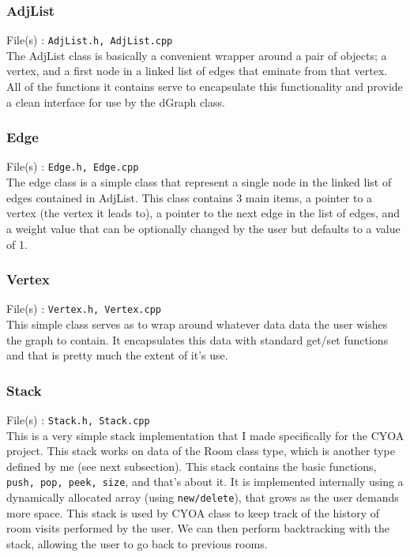 \documentclass[a4paper,11pt]{article}
\begin{document}
    \subsubsection{AdjList}
    File(s) : \texttt{AdjList.h, AdjList.cpp} \\
    The AdjList class is basically a convenient wrapper around a pair of objects; a vertex, and a first node in a linked list of edges that eminate from that vertex. All of the functions it contains serve to encapsulate this functionality and provide a clean interface for use by the dGraph class. 

    \subsubsection{Edge}
    File(s) : \texttt{Edge.h, Edge.cpp} \\
    The edge class is a simple class that represent a single node in the linked list of edges contained in AdjList. This class contains 3 main items, a pointer to a vertex (the vertex it leads to), a pointer to the next edge in the list of edges, and a weight value that can be optionally changed by the user but defaults to a value of 1.

    \subsubsection{Vertex}
    File(s) : \texttt{Vertex.h, Vertex.cpp} \\
    This simple class serves as to wrap around whatever data data the user wishes the graph to contain. It encapsulates this data with standard get/set functions and that is pretty much the extent of it's use.

    \subsubsection{Stack}
    File(s) : \texttt{Stack.h, Stack.cpp} \\
    This is a very simple stack implementation that I made specifically for the CYOA project. This stack works on data of the Room class type, which is another type defined by me (see next subsection). This stack contains the basic functions, \texttt{push, pop, peek, size}, and that's about it. It is implemented internally using a dynamically allocated array (using \texttt{new/delete}), that grows as the user demands more space. This stack is used by CYOA class to keep track of the history of room visits performed by the user. We can then perform backtracking with the stack, allowing the user to go back to previous rooms.
\end{document}
